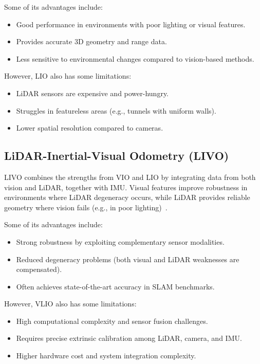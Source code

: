 \documentclass[english, bachelor, utf8]{base/thesis_telematics}
\begin{document}
Some of its advantages include:
\begin{itemize}
    \item Good performance in environments with poor lighting or visual features.
    \item Provides accurate 3D geometry and range data.
    \item Less sensitive to environmental changes compared to vision-based methods.
\end{itemize}

However, LIO also has some limitations:
\begin{itemize}
    \item LiDAR sensors are expensive and power-hungry.
    \item Struggles in featureless areas (e.g., tunnels with uniform walls).
    \item Lower spatial resolution compared to cameras.
\end{itemize}

\subsection{LiDAR-Inertial-Visual Odometry (LIVO)}
LIVO combines the strengths from VIO and LIO by integrating data from both vision and LiDAR, together with IMU.
Visual features improve robustness in environments where LiDAR degeneracy occurs, while LiDAR provides reliable geometry where vision fails (e.g., in poor lighting)~\cite{yuan2024sr,fastlivo2}.

Some of its advantages include:
\begin{itemize}
    \item Strong robustness by exploiting complementary sensor modalities.
    \item Reduced degeneracy problems (both visual and LiDAR weaknesses are compensated).
    \item Often achieves state-of-the-art accuracy in SLAM benchmarks.
\end{itemize}

However, VLIO also has some limitations:
\begin{itemize}
    \item High computational complexity and sensor fusion challenges.
    \item Requires precise extrinsic calibration among LiDAR, camera, and IMU.
    \item Higher hardware cost and system integration complexity.
\end{itemize}
\end{document}
